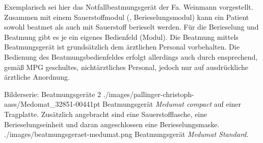 {%
Exemplarisch sei hier das Notfallbeatmungsgerät 
 der
Fa. Weinmann vorgestellt. 
Zusammen mit einem Sauerstoffmodul (, Berieselungsmodul) 
kann ein Patient sowohl beatmet als auch mit Sauerstoff berieselt werden. 
Für die Berieselung und Beatmung gibt es je ein eigenes
Bedienfeld (Modul). 
Die Beatmung mittels Beatmungsgerät ist
grundsätzlich dem ärztlichen Personal vorbehalten. 
Die Bedienung des Beatmungsbedienfeldes erfolgt allerdings auch durch ensprechend, gemäß MPG geschultes, nichtärztliches Personal, 
jedoch nur auf ausdrückliche ärztliche Anordnung.%
}


\begin{PictureSeriesWide}{}{Bilderserie: Beatmungsgeräte}
\PictureSeriesRowWide
{2}%
{./images/pallinger-christoph-aass/Medomat_32851-00441pt}%
{Beatmungsgerät \emph{Medumat compact\texttrademark} auf einer Tragplatte. 
Zusätzlich angebracht sind eine 
Sauerstofflasche, 
eine Berieselungseinheit
und daran angeschlossen eine Berieselungsmaske.
}%
{./images/beatmungsgeraet-medumat.png}%
{Beatmungsgerät \emph{Medumat Standard\texttrademark}. 
}%
{}%
{}%
{}%
{}%

\end{PictureSeriesWide}

